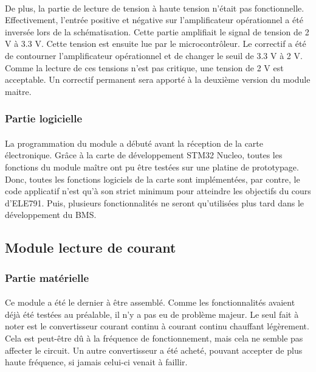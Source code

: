 			\paragraph{}
			De plus, la partie de lecture de tension à haute tension n’était pas fonctionnelle. Effectivement, l’entrée positive et négative sur l'amplificateur opérationnel a été inversée lors de la schématisation. Cette partie amplifiait le signal de tension de 2 V à 3.3 V. Cette tension est ensuite lue par le microcontrôleur. Le correctif a été de contourner l’amplificateur opérationnel et de changer le seuil de 3.3 V à 2 V. Comme la lecture de ces tensions n’est pas critique, une tension de 2 V est acceptable. Un correctif permanent sera apporté à la deuxième version du module maitre.

		\subsubsection{Partie logicielle}

			\paragraph{}
			La programmation du module a débuté avant la réception de la carte électronique. Grâce à la carte de développement STM32 Nucleo, toutes les fonctions du module maître ont pu être testées sur une platine de prototypage. Donc, toutes les fonctions logiciels de la carte sont implémentées, par contre, le code applicatif n’est qu’à son strict minimum pour atteindre les objectifs du cours d’ELE791. Puis, plusieurs fonctionnalités ne seront qu’utilisées plus tard dans le développement du BMS.

	\subsection{Module lecture de courant}

		\subsubsection{Partie matérielle}

			\paragraph{}
			Ce module a été le dernier à être assemblé. Comme les fonctionnalités avaient déjà été testées au préalable, il n’y a pas eu de problème majeur. Le seul fait à noter est le convertisseur courant continu à courant continu chauffant légèrement. Cela est peut-être dû à la fréquence de fonctionnement, mais cela ne semble pas affecter le circuit. Un autre convertisseur a été acheté, pouvant accepter de plus haute fréquence, si jamais celui-ci venait à faillir.

